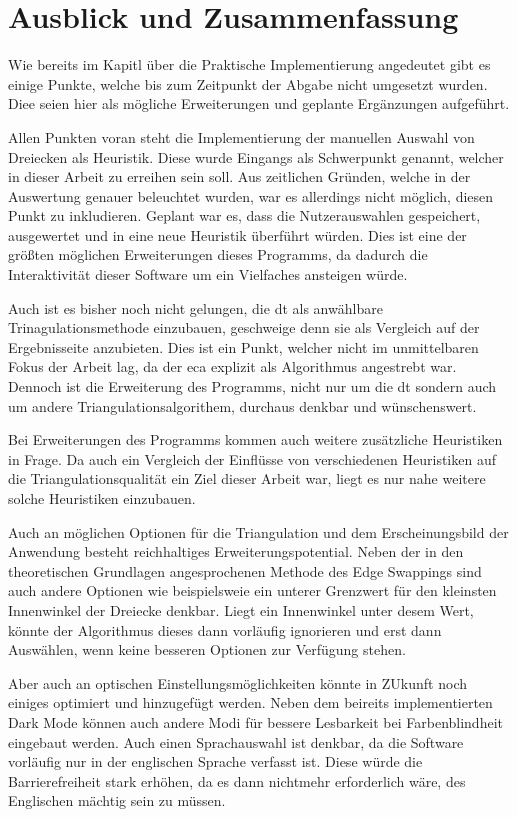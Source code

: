 \section{Ausblick und Zusammenfassung}
Wie bereits im Kapitl über die Praktische Implementierung angedeutet gibt es einige Punkte, welche bis zum Zeitpunkt der Abgabe nicht umgesetzt wurden.
Diee seien hier als mögliche Erweiterungen und geplante Ergänzungen aufgeführt.

Allen Punkten voran steht die Implementierung der manuellen Auswahl von Dreiecken als Heuristik. Diese wurde Eingangs als Schwerpunkt genannt, welcher in dieser Arbeit zu erreihen sein soll. 
Aus zeitlichen Gründen, welche in der Auswertung genauer beleuchtet wurden, war es allerdings nicht möglich, diesen Punkt zu inkludieren. Geplant war es, dass die Nutzerauswahlen gespeichert, 
ausgewertet und in eine neue Heuristik überführt würden. Dies ist eine der größten möglichen Erweiterungen dieses Programms, da dadurch die Interaktivität dieser Software um ein Vielfaches 
ansteigen würde.

Auch ist es bisher noch nicht gelungen, die \ac{dt} als anwählbare Trinagulationsmethode einzubauen, geschweige denn sie als Vergleich auf der Ergebnisseite 
anzubieten. Dies ist ein Punkt, welcher nicht im unmittelbaren Fokus der Arbeit lag, da der \ac{eca} explizit als Algorithmus angestrebt war.
Dennoch ist die Erweiterung des Programms, nicht nur um die \ac{dt} sondern auch um andere Triangulationsalgorithem, durchaus denkbar und wünschenswert.

Bei Erweiterungen des Programms kommen auch weitere zusätzliche Heuristiken in Frage. Da auch ein Vergleich der Einflüsse von verschiedenen Heuristiken auf die Triangulationsqualität ein Ziel dieser 
Arbeit war, liegt es nur nahe weitere solche Heuristiken einzubauen.

Auch an möglichen Optionen für die Triangulation und dem Erscheinungsbild der Anwendung besteht reichhaltiges Erweiterungspotential. Neben der in den theoretischen Grundlagen angesprochenen Methode des 
Edge Swappings sind auch andere Optionen wie beispielsweie ein unterer Grenzwert für den kleinsten Innenwinkel der Dreiecke denkbar. Liegt ein Innenwinkel unter desem Wert, könnte der Algorithmus dieses dann 
vorläufig ignorieren und erst dann Auswählen, wenn keine besseren Optionen zur Verfügung stehen.

Aber auch an optischen Einstellungsmöglichkeiten könnte in ZUkunft noch einiges optimiert und hinzugefügt werden. Neben dem beireits implementierten Dark Mode können auch andere Modi für bessere Lesbarkeit bei Farbenblindheit 
eingebaut werden. Auch einen Sprachauswahl ist denkbar, da die Software vorläufig nur in der englischen Sprache verfasst ist. Diese würde die Barrierefreiheit stark erhöhen, da es dann nichtmehr erforderlich wäre, des Englischen mächtig sein 
zu müssen.


